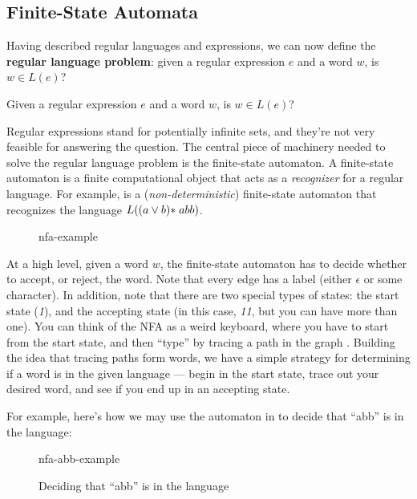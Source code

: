 \subsection{Finite-State Automata}
Having described regular languages and expressions, we can now define the \textbf{regular language problem}: given a regular expression $e$ and a word $w$, is $w \in L(e)$?

\begin{definition}
    Given a regular expression $e$ and a word $w$, is $w \in L(e)$?
\end{definition}

Regular expressions stand for potentially infinite sets, and they're not very feasible for answering the question. The central piece of machinery needed to solve the regular language problem is the finite-state automaton. A finite-state automaton is a finite computational object that acts as a \emph{recognizer} for a regular language. For example,  is a (\emph{non-deterministic}) finite-state automaton that recognizes the language $L((a \lor b)\* abb)$. 

\begin{figure}[H]
    \centering
    {nfa-example}
    \label{fig:nfa-example}
\end{figure}

At a high level, given a word $w$, the finite-state automaton has to decide whether to accept, or reject, the word. Note that every edge has a label (either $\epsilon$ or some character). In addition, note that there are two special types of states: the start state (\textit{1}), and the accepting state (in this case, \textit{11}, but you can have more than one). You can think of the NFA as a weird keyboard, where you have to start from the start state, and then ``type'' by tracing a path in the graph . Building the idea that tracing paths form words, we have a simple strategy for determining if a word is in the given language --- begin in the start state, trace out your desired word, and see if you end up in an accepting state. 

For example, here's how we may use the automaton in  to decide that ``abb'' is in the language:\par

\begin{figure}[H]
    \begin{center}
    {nfa-abb-example}
    \end{center}
    \caption{Deciding that ``abb'' is in the language}
    \label{fig:nfa-decision}
\end{figure}

